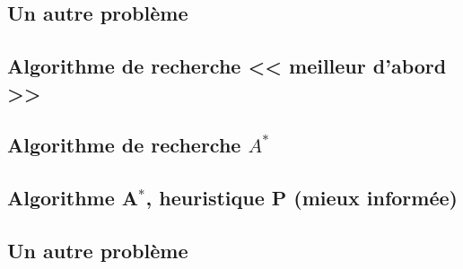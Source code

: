 \documentclass[12pt,a4paper,openany]{book}
\begin{document}
	\subsection{Un autre problème}
	\subsection{Algorithme de recherche << meilleur d'abord >>}
	\subsection{Algorithme de recherche $A^*$}
	\subsection{Algorithme A$^*$, heuristique P (mieux informée)}
	\subsection{Un autre problème}
	\appendix
	\lstlistoflistings
\end{document}
